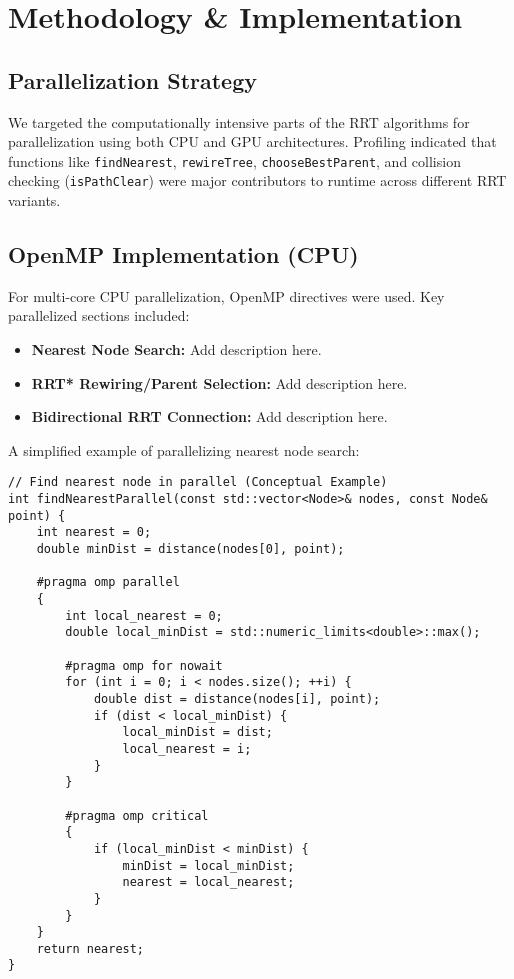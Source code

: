 \documentclass{article}
\begin{document}
\section{Methodology \& Implementation}

\subsection{Parallelization Strategy}
We targeted the computationally intensive parts of the RRT algorithms for parallelization using both CPU and GPU architectures. Profiling indicated that functions like \texttt{findNearest}, \texttt{rewireTree}, \texttt{chooseBestParent}, and collision checking (\texttt{isPathClear}) were major contributors to runtime across different RRT variants.

\subsection{OpenMP Implementation (CPU)}
For multi-core CPU parallelization, OpenMP directives were used. Key parallelized sections included:
\begin{itemize}
    \item \textbf{Nearest Node Search:} Add description here.
    \item \textbf{RRT* Rewiring/Parent Selection:} Add description here.
    \item \textbf{Bidirectional RRT Connection:} Add description here.
\end{itemize}

A simplified example of parallelizing nearest node search:
\begin{verbatim}
// Find nearest node in parallel (Conceptual Example)
int findNearestParallel(const std::vector<Node>& nodes, const Node& point) {
    int nearest = 0;
    double minDist = distance(nodes[0], point);

    #pragma omp parallel
    {
        int local_nearest = 0;
        double local_minDist = std::numeric_limits<double>::max();

        #pragma omp for nowait
        for (int i = 0; i < nodes.size(); ++i) {
            double dist = distance(nodes[i], point);
            if (dist < local_minDist) {
                local_minDist = dist;
                local_nearest = i;
            }
        }

        #pragma omp critical
        {
            if (local_minDist < minDist) {
                minDist = local_minDist;
                nearest = local_nearest;
            }
        }
    }
    return nearest;
}
\end{verbatim}
\end{document}
